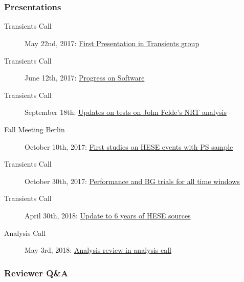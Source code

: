 \appendix
\part*{\appendixname}
\section{Presentations}
\begin{description}
  \item[Transients Call] May 22nd, 2017: \href{https://drive.google.com/file/d/0B_Gkg-MCR-1za1RMbjlzTFE0YVU/view}{First Presentation in Transients group}
  \item[Transients Call] June 12th, 2017: \href{https://drive.google.com/file/d/0B_Gkg-MCR-1zTFI3Umg3XzZrSE0/view}{Progress on Software}
  \item[Transients Call] September 18th: \href{https://drive.google.com/file/d/0B_Gkg-MCR-1zR28tTmhBT3VYTGs/view}{Updates on tests on John Felde's NRT analysis}
  \item[Fall Meeting Berlin] October 10th, 2017: \href{https://events.icecube.wisc.edu/getFile.py/access?contribId=37&sessionId=32&resId=0&materialId=slides&confId=90}{First studies on HESE events with PS sample}
  \item[Transients Call] October 30th, 2017: \href{https://drive.google.com/file/d/0B_Gkg-MCR-1zOFdkajczT3JWNUU/view}{Performance and BG trials for all time windows}
  \item[Transients Call] April 30th, 2018: \href{https://drive.google.com/file/d/12vOMOpt1nMrmnBdM_4wV5sMdg0FUJLqF/view}{Update to 6 years of HESE sources}
  \item[Analysis Call] May 3rd, 2018: \href{https://drive.google.com/file/d/199a-w_JzH4m6RdVKmOb57rWMw4-HDSJj/view}{Analysis review in analysis call}
\end{description}

\section*{Reviewer Q\&A}
